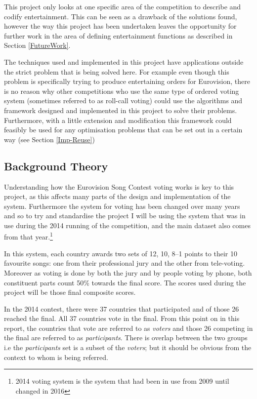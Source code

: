 \documentclass[12pt]{report}
\begin{document}
This project only looks at one specific area of the competition to describe and codify entertainment. This can be seen as a drawback of the solutions found, however the way this project has been undertaken leaves the opportunity for further work in the area of defining entertainment functions as described in Section \ref{FutureWork}.

The techniques used and implemented in this project have applications outside the strict problem that is being solved here. For example even though this problem is specifically trying to produce entertaining orders for Eurovision, there is no reason why other competitions who use the same type of ordered voting system (sometimes referred to as roll-call voting) could use the algorithms and framework designed and implemented in this project to solve their problems. Furthermore, with a little extension and modification this framework could feasibly be used for any optimisation problems that can be set out in a certain way (see Section \ref{Imp-Reuse})

\subsection{Background Theory}\label{BackgroundTheory}
Understanding how the Eurovision Song Contest voting works is key to this project, as this affects many parts of the design and implementation of the system. Furthermore the system for voting has been changed over many years and so to try and standardise the project I will be using the system that was in use during the 2014\cite{Eurovision2014} running of the competition, and the main dataset also comes from that year.\footnote{2014 voting system is the system that had been in use from 2009 until changed in 2016}

In this system, each country awards two sets of 12, 10, 8–1 points to their 10 favourite songs: one from their professional jury and the other from tele-voting. Moreover as voting is done by both the jury and by people voting by phone, both constituent parts count 50\% towards the final score. The scores used during the project will be those final composite scores.

In the 2014 contest, there were 37 countries that participated and of those 26 reached the final. All 37 countries vote in the final. From this point on in this report, the countries that vote are referred to as \textit{voters} and those 26 competing in the final are referred to as \textit{participants}. There is overlap between the two groups i.e the \textit{participants} set is a subset of the \textit{voters}; but it should be obvious from the context to whom is being referred.
\end{document}
